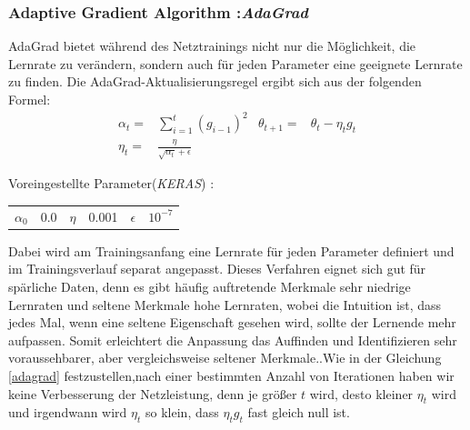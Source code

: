 \documentclass[12pt,a4paper]{scrartcl}
\numberwithin{equation}{section}
\begin{document}
\subsubsection{Adaptive Gradient Algorithm :\textit{AdaGrad}}
AdaGrad bietet während des Netztrainings nicht nur die Möglichkeit, die Lernrate zu verändern, sondern auch für jeden Parameter eine geeignete Lernrate zu finden. Die AdaGrad-Aktualisierungsregel ergibt sich aus der folgenden Formel:
	\begin{equation}\label{adagrad}
		\begin{aligned}
		\alpha_{t}=&\sum_{i = 1}^{t}{(g_{i-1})^2} &
			\theta_{t+1} =& \theta_{t} -\eta_{t} g_t \\ \eta_{t} =& \frac{\eta}{\sqrt{\alpha_{t}}+\epsilon}
		\end{aligned}
	\end{equation}
\begin{center}
	Voreingestellte Parameter(\textit{KERAS}) :
	\begin{tabular}{r@{= }l c@{= }c r@{= }l}
		$ \alpha_{0} $& 0.0 & $ \eta$& 0.001& $ \epsilon $ & $ 10^{-7} $
	\end{tabular}
\end{center}
Dabei wird am Trainingsanfang eine Lernrate für jeden Parameter definiert und im Trainingsverlauf separat angepasst. 
 Dieses Verfahren eignet sich gut für spärliche Daten, denn es gibt häufig auftretende Merkmale sehr niedrige Lernraten und seltene Merkmale hohe Lernraten, wobei die Intuition ist, dass jedes Mal, wenn eine seltene Eigenschaft gesehen wird, sollte der Lernende mehr aufpassen. Somit erleichtert die Anpassung das Auffinden und Identifizieren sehr voraussehbarer, aber vergleichsweise seltener Merkmale.\cite{AdaGrad}.Wie in der Gleichung \eqref{adagrad} festzustellen,nach einer bestimmten Anzahl von Iterationen haben wir keine Verbesserung der Netzleistung, denn je größer $ t $ wird, desto kleiner $ \eta_{t} $ wird und irgendwann wird $ \eta_{t} $ so klein, dass $ \eta_{t}g_{t} $ fast gleich null ist.
\end{document}
